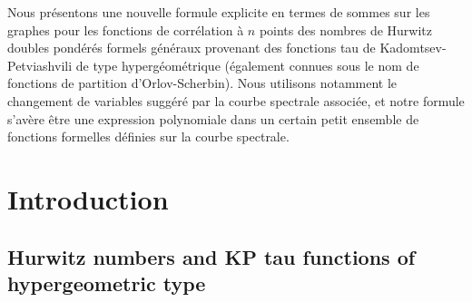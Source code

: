 \documentclass[JEP,XML,SOM,Unicode,NoEqCountersInSection,NoFloatCountersInSection]{cedram}
\theoremstyle{plain}
\theoremstyle{definition}
\theoremstyle{remark}
\begin{document}
\begin{abstract}
We derive a new explicit formula in terms of sums over graphs for the $n$-point correlation functions of general formal weighted double Hurwitz numbers coming from the Kadomtsev--Petviashvili tau functions of hypergeometric type (also known as Orlov--Scherbin partition functions). Notably, we use the change of variables suggested by the associated spectral curve, and our formula turns out to be a polynomial expression in a certain small set of formal functions defined on the spectral curve.
\end{abstract}





\begin{altabstract}
Nous présentons une nouvelle formule explicite en termes de sommes sur les graphes pour les fonctions de corrélation à $n$ points des nombres de Hurwitz doubles pondérés formels généraux provenant des fonctions tau de Kadomtsev-Petviashvili de type hypergéométrique (également connues sous le nom de fonctions de partition d'Orlov-Scherbin). Nous utilisons notamment le changement de variables suggéré par la courbe spectrale associée, et notre formule s'avère être une expression polynomiale dans un certain petit ensemble de fonctions formelles définies sur la courbe spectrale.
\end{altabstract}

\maketitle
\tableofcontents
\mainmatter

\section{Introduction}

\subsection{Hurwitz numbers and KP tau functions of hypergeometric type}
\end{document}
